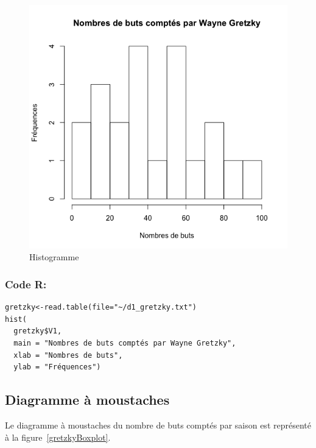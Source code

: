 \documentclass[10pt,twocolumn]{article}
\begin{document}
\begin{figure}[htbp]
	\caption{Histogramme}
	\label{gretzkyHist}
	\centering
	\includegraphics[width=\linewidth]{d1_gretzkyHist}
\end{figure}

\subsubsection*{Code R:}
\begin{verbatim}
gretzky<-read.table(file="~/d1_gretzky.txt")
hist(
  gretzky$V1,
  main = "Nombres de buts comptés par Wayne Gretzky",
  xlab = "Nombres de buts",
  ylab = "Fréquences")
\end{verbatim}


\subsection{Diagramme à moustaches}
Le diagramme à moustaches du nombre de buts comptés par saison est représenté à la figure~\ref{gretzkyBoxplot}.
\end{document}
